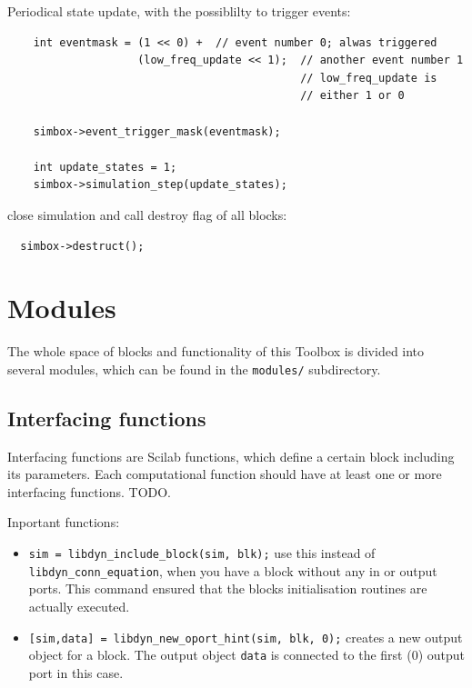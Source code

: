 \documentclass[%
	pdftex,%
	a4paper,%
	oneside,%
	11pt,%
	halfparskip,%
	headsepline,%
	bibtotocnumbered,%
	idxtotoc%
]{scrartcl}
\begin{document}
Periodical state update, with the possiblilty to trigger events:

\begin{verbatim}
    int eventmask = (1 << 0) +  // event number 0; alwas triggered
                    (low_freq_update << 1);  // another event number 1 
                                             // low_freq_update is 
                                             // either 1 or 0

    simbox->event_trigger_mask(eventmask);
    
    int update_states = 1;
    simbox->simulation_step(update_states); 
\end{verbatim}

close simulation and call destroy flag of all blocks:

\begin{verbatim}
  simbox->destruct();
\end{verbatim}

\section{Modules}

The whole space of blocks and functionality of this Toolbox is divided into several modules, which can be found in the \texttt{modules/} subdirectory.

\subsection{Interfacing functions}

Interfacing functions are Scilab functions, which define a certain block including its parameters. Each computational function should have at least one or more interfacing functions. TODO.


Inportant functions:

\begin{itemize}
 \item \texttt{sim = libdyn\_include\_block(sim, blk);} use this instead of \texttt{libdyn\_conn\_equation}, when you have a block without any in or output ports. This command ensured that the blocks initialisation routines are actually executed.
 \item \texttt{[sim,data] = libdyn\_new\_oport\_hint(sim, blk, 0);} creates a new output object for a block. The output object \texttt{data} is connected to the first (0) output port in this case.
\end{itemize}
\end{document}
